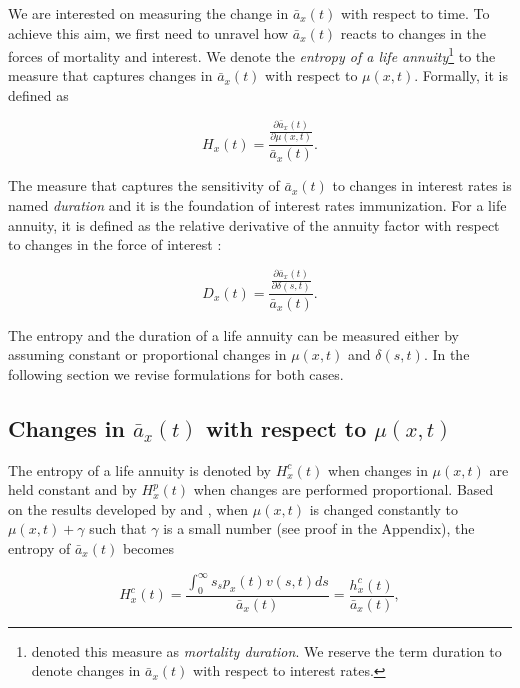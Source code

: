 \documentclass[12pt]{article}
\begin{document}
We are interested on measuring the change in $\bar{a}_x(t)$ with respect to time. To achieve this aim, we first need to unravel how $\bar{a}_x(t)$ reacts to changes in the forces of mortality and interest. We denote the \textit{entropy of a life annuity}\footnote{\cite{Tsai2011,Tsai2013a,Lin2020} denoted this measure as \textit{mortality duration}. We reserve the term duration to denote changes in $\bar{a}_x(t)$ with respect to interest rates.} to the measure that captures changes in $\bar{a}_x(t)$ with respect to $\mu(x,t)$. Formally, it is defined as 

\begin{equation}\label{eq:EntropyGeneral}
{H}_{x}(t) = \frac{ \frac{\partial \bar{a}_x(t) }{\partial \mu(x,t)}}{\bar{a}_x(t)}.
\end{equation}

The measure that captures the sensitivity of $\bar{a}_x(t)$ to changes in interest rates is named \textit{duration} and it is the foundation of interest rates immunization. For a life annuity, it is defined as the relative derivative of the annuity factor with respect to changes in the force of interest \citep{Milevsky2012}:


\begin{equation}\label{eq:EntropyGeneral}
{D}_{x}(t) = \frac{ \frac{\partial \bar{a}_x(t) }{\partial \delta(s,t)}}{\bar{a}_x(t)}.
\end{equation}


The entropy and the duration of a life annuity can be measured either by assuming constant or proportional changes in $\mu(x,t)$ and $\delta(s,t)$. In the following section we revise formulations for both cases. 



\subsection{Changes in $\bar{a}_x(t)$ with respect to $\mu(x,t)$}

The entropy of a life annuity is denoted by ${H}^{c}_{x}(t)$ when changes in $\mu(x,t)$ are held constant and by ${H}^{p}_{x}(t)$ when  changes are performed proportional. Based on the results developed by \citet{Tsai2013a} and \citet{Lin2020}, when $\mu(x,t)$ is changed constantly to $\mu(x,t)+\gamma$ such that $\gamma$ is a small number (see proof in the Appendix), the entropy of $\bar{a}_x(t)$ becomes

\begin{equation}\label{eq:EntropyC}
{H}^{c}_{x}(t) = \frac{\int_{0}^\infty s {}_sp_x(t) {v}(s,t) ds}{\bar{a}_x(t)}=\frac{{h}^{c}_{x}(t)}{\bar{a}_x(t)},
\end{equation}
\end{document}
